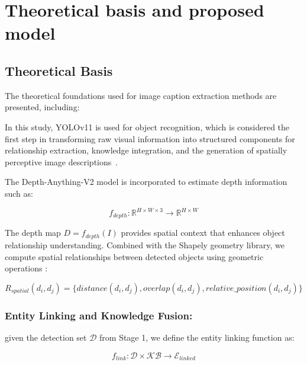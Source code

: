 \documentclass[runningheads,14pt]{llncs}
\begin{document}
\section{Theoretical basis and proposed model}

\subsection{Theoretical Basis}

The theoretical foundations used for image caption extraction methods are presented, including: 

 In this study, YOLOv11 is used for object recognition, 
which is considered the first step in transforming raw visual information into structured components for relationship extraction, knowledge integration, 
and the generation of spatially perceptive image descriptions~\cite{ultralytics2024yolov11}.

The Depth-Anything-V2 model \cite{yang2024depth} is incorporated to estimate depth information such as: 

\begin{equation}
f_{depth}: \mathbb{R}^{H \times W \times 3} \rightarrow \mathbb{R}^{H \times W}
\end{equation}

The depth map $D = f_{depth}(I)$ provides spatial context that enhances object relationship understanding. Combined with the Shapely geometry library, we compute spatial relationships between detected objects using geometric operations \cite{gillies2007shapely}:

\begin{equation}
R_{spatial}(d_i, d_j) = \{distance(d_i, d_j), overlap(d_i, d_j), relative\_position(d_i, d_j)\}
\end{equation}



\subsubsection{Entity Linking and Knowledge Fusion:}
given the detection set $\mathcal{D}$ from Stage 1, we define the entity linking function \cite{marino2017ok} as:

\begin{equation}
f_{link}: \mathcal{D} \times \mathcal{KB} \rightarrow \mathcal{E}_{linked}
\end{equation}
\end{document}
